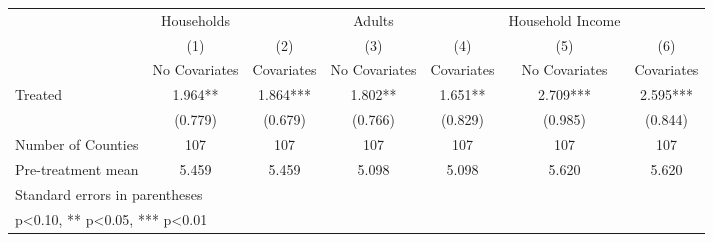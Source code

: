 {
\def\sym#1{\ifmmode^{#1}\else\(^{#1}\)\fi}
\begin{tabular}{l*{6}{c}}
\hline\hline
            &  Households   &               &      Adults   &               &Household Income   &               \\
            &\multicolumn{1}{c}{(1)}&\multicolumn{1}{c}{(2)}&\multicolumn{1}{c}{(3)}&\multicolumn{1}{c}{(4)}&\multicolumn{1}{c}{(5)}&\multicolumn{1}{c}{(6)}\\
            &\multicolumn{1}{c}{No Covariates}&\multicolumn{1}{c}{Covariates}&\multicolumn{1}{c}{No Covariates}&\multicolumn{1}{c}{Covariates}&\multicolumn{1}{c}{No Covariates}&\multicolumn{1}{c}{Covariates}\\
\hline
Treated     &       1.964** &       1.864***&       1.802** &       1.651** &       2.709***&       2.595***\\
            &     (0.779)   &     (0.679)   &     (0.766)   &     (0.829)   &     (0.985)   &     (0.844)   \\
\hline
Number of Counties&         107   &         107   &         107   &         107   &         107   &         107   \\
Pre-treatment mean&       5.459   &       5.459   &       5.098   &       5.098   &       5.620   &       5.620   \\
\hline\hline
\multicolumn{7}{l}{\footnotesize Standard errors in parentheses}\\
\multicolumn{7}{l}{\footnotesize * p<0.10, ** p<0.05, *** p<0.01}\\
\end{tabular}
}

